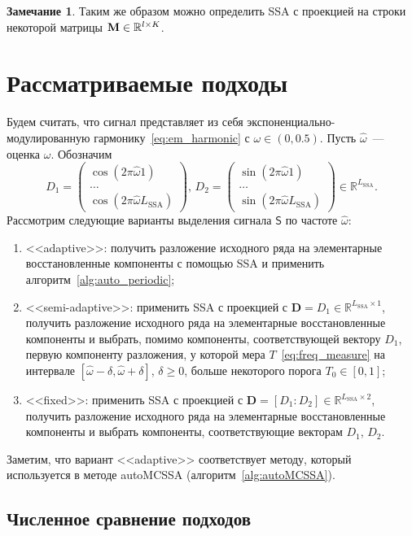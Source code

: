 \documentclass[specialist,
substylefile = spbu_report.rtx,
subf,12pt]{disser}
\theoremstyle{definition}
\newtheorem{remark}{Замечание}[chapter]
\newcommand{\R}{\mathbb{R}}
\begin{document}
\begin{remark}
	Таким же образом можно определить SSA с проекцией на строки некоторой матрицы $\bfM\in\R^{l\times K}$.
\end{remark}

\section{Рассматриваемые подходы}

Будем считать, что сигнал представляет из себя экспоненциально-модулированную гармонику~\eqref{eq:em_harmonic} с $\omega\in(0, 0.5)$. Пусть $\hat\omega$~--- оценка $\omega$. Обозначим
\[
	D_1=\begin{pmatrix}
		\cos(2\pi\hat\omega 1) \\
		\ldots                 \\
		\cos(2\pi\hat\omega L_\text{SSA})
	\end{pmatrix}, \,
	D_2=\begin{pmatrix}
		\sin(2\pi\hat\omega 1) \\
		\ldots                 \\
		\sin(2\pi\hat\omega L_\text{SSA})
	\end{pmatrix}\in \R^{L_\text{SSA}}.
\]
Рассмотрим следующие варианты выделения сигнала $\mathsf{S}$ по частоте $\hat \omega$:
\begin{enumerate}
	\item <<adaptive>>: получить разложение исходного ряда на элементарные восстановленные компоненты с помощью SSA и применить алгоритм~\ref{alg:auto_periodic};
	\item  <<semi-adaptive>>: применить SSA с проекцией с $\mathbf{D}=D_1\in \R^{L_\text{SSA}\times 1}$, получить разложение исходного ряда на элементарные восстановленные компоненты и выбрать, помимо компоненты, соответствующей вектору $D_1$, первую компоненту разложения, у которой мера $T$~\eqref{eq:freq_measure} на интервале $[\hat\omega-\delta, \hat\omega+\delta]$, $\delta\geqslant0$, больше некоторого порога $T_0\in[0, 1]$;
	\item <<fixed>>: применить SSA с проекцией с $\mathbf{D}=[D_1:D_2]\in\R^{L_\text{SSA}\times 2}$, получить разложение исходного ряда на элементарные восстановленные компоненты и выбрать компоненты, соответствующие векторам $D_1$, $D_2$.
\end{enumerate}
Заметим, что вариант <<adaptive>> соответствует методу, который используется в методе autoMCSSA (алгоритм~\ref{alg:autoMCSSA}).

\subsection{Численное сравнение подходов}
\end{document}
